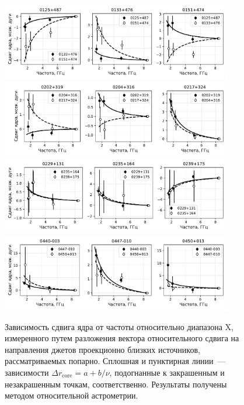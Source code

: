 \begin{figure}
 \centering
 \includegraphics[width=0.9\textwidth]{cs_vs_freq_using_jet_pa/cs_0}
 \includegraphics[width=0.9\textwidth]{cs_vs_freq_using_jet_pa/cs_1}
 \includegraphics[width=0.9\textwidth]{cs_vs_freq_using_jet_pa/cs_2}
 \includegraphics[width=0.9\textwidth]{cs_vs_freq_using_jet_pa/cs_3}
 \caption{Зависимость сдвига ядра от частоты относительно диапазона X, измеренного путем разложения
вектора относительного сдвига на направления джетов проекционно близких источников, рассматриваемых
попарно. Сплошная и пунктирная линии~--- зависимости $\Delta r_\text{core} = a + b/\nu$,
подогнанные к закрашенным и незакрашенным точкам, соответственно. Результаты получены методом
относительной астрометрии.}
 \label{fig:cs_vs_freq_using_jet_pa}
\end{figure}

